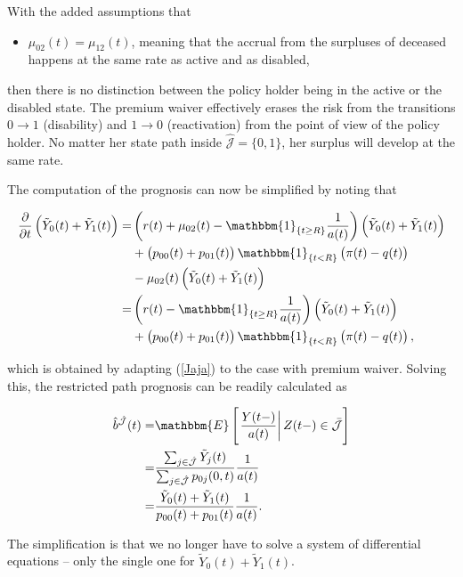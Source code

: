 \documentclass{article}
\newcommand{\1}[1]{\mathbbm{1}_{\left\lbrace #1 \right\rbrace}}
\newcommand{\econd}[2][def]{\mathbbm{E} \left[ \left. #1 \right| #2 \right]}
\theoremstyle{break}
\theoremstyle{remark}
\numberwithin{equation}{section}
\begin{document}
With the added assumptions that

\begin{itemize}
	\item $\mu_{02}(t) = \mu_{12}(t)$, meaning that the accrual from the surpluses of deceased happens at the same rate as active and as disabled,
\end{itemize}

then there is no distinction between the policy holder being in the active or the disabled state. The premium waiver effectively erases the risk from the transitions $0 \to 1$ (disability) and $1 \to 0$ (reactivation) from the point of view of the policy holder. No matter her state path inside $\hat{\mathcal{J}} = \{ 0,1 \}$, her surplus will develop at the same rate.

The computation of the prognosis can now be simplified by noting that

\begin{align*}
	\frac{\partial}{\partial t} \left(\tilde{Y}_0(t) + \tilde{Y}_1(t)\right) =& \left( r(t) + \mu_{02}(t) - \1{t \geq R} \frac{1}{a(t)}\right) \left(\tilde{Y}_0(t) + \tilde{Y}_1(t)\right) \\
	&+ \left(p_{00}(t) + p_{01}(t)\right)\1{t<R}\left(\pi(t) - q(t)\right) \\
	&- \mu_{02}(t) \left(\tilde{Y}_0(t) + \tilde{Y}_1(t)\right) \\
	=& \left( r(t) - \1{t \geq R} \frac{1}{a(t)}\right) \left(\tilde{Y}_0(t) + \tilde{Y}_1(t)\right) \\
	&+ \left(p_{00}(t) + p_{01}(t)\right)\1{t<R}\left(\pi(t) - q(t)\right),
\end{align*}

which is obtained by adapting (\ref{Jaja}) to the case with premium waiver. Solving this, the restricted path prognosis can be readily calculated as

\begin{align*}
	\hat{b}^{\hat{\mathcal{J}}}(t) =& \econd[\frac{Y(t-)}{a(t)}]{Z(t-) \in \bar{\mathcal{J}}} \\
	=&\frac{\sum_{j \in \hat{\mathcal{J}}} \tilde{Y}_j(t)}{\sum_{j \in \hat{\mathcal{J}}} p_{0j}(0,t)} \frac{1}{a(t)} \\
	=&\frac{\tilde{Y}_0(t) + \tilde{Y}_1(t)}{p_{00}(t) + p_{01}(t)} \frac{1}{a(t)}.
\end{align*}

The simplification is that we no longer have to solve a system of differential equations -- only the single one for $\tilde{Y}_0(t) + \tilde{Y}_1(t)$.
\end{document}
